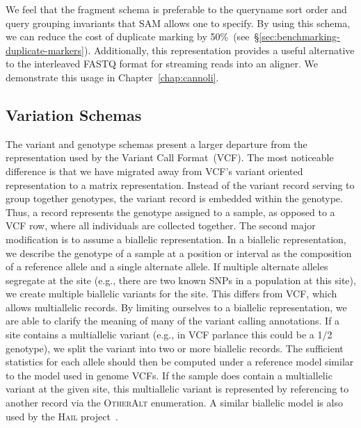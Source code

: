 \documentclass[phd]{ucbthesis}
\begin{document}
We feel that the fragment schema is preferable to the queryname sort order and
query grouping invariants that \textsc{SAM} allows one to specify. By using this
schema, we can reduce the cost of duplicate marking by
50\%~(see~\S\ref{sec:benchmarking-duplicate-markers}). Additionally, this
representation provides a useful alternative to the interleaved FASTQ format for
streaming reads into an aligner. We demonstrate this usage in
Chapter~\ref{chap:cannoli}.

\subsection{Variation Schemas}
\label{sec:variation-schemas}

The variant and genotype schemas present a larger departure from the representation used by the Variant Call
Format~(\textsc{VCF}). The most noticeable difference is that we have migrated away from \textsc{VCF}'s variant oriented
representation to a matrix representation. Instead of the variant record serving to group together genotypes, the
variant record is embedded within the genotype. Thus, a record represents the genotype assigned to a sample,
as opposed to a \textsc{VCF} row, where all individuals are collected together. The second major modification is to assume
a biallelic representation. In a biallelic representation, we describe the genotype of a sample at a position or
interval as the composition of a reference allele and a single alternate allele. If multiple alternate alleles segregate at
the site (e.g., there are two known SNPs in a population at this site), we create multiple biallelic variants for the site.
This differs from \textsc{VCF}, which allows multiallelic records. By limiting
ourselves to a biallelic representation, we are able to clarify the meaning of many of the variant calling annotations. If a
site contains a multiallelic variant (e.g., in \textsc{VCF} parlance this could be a \textsc{1/2} genotype), we split the
variant into two or more biallelic records. The sufficient statistics for each allele should then be computed under
a reference model similar to the model used in genome \textsc{VCF}s. If the sample does contain a multiallelic variant at
the given site, this multiallelic variant is represented by referencing to another record via the \textsc{OtherAlt}
enumeration. A similar biallelic model is also used by the \textsc{Hail} project~\cite{hail}.
\end{document}

